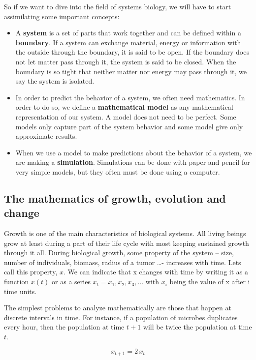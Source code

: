 \documentclass[12pt]{article}
\begin{document}
So if we want to dive into the field of systems biology, we will have to start assimilating some important concepts: 
\begin{itemize}
	\item A \textbf{system} is a set of parts that work together and can be defined within a \textbf{boundary}. If a system can exchange material, energy or information with the outside through the boundary, it is said to be open. If the boundary does not let matter pass through it, the system is said to be closed. When the boundary is so tight that neither matter nor energy may pass through it, we say the system is isolated.
	\item In order to predict the behavior of a system, we often need mathematics. In order to do so, we define a \textbf{mathematical model} as any mathematical representation of our system. A model does not need to be perfect. Some models only capture part of the system behavior and some model give only  approximate results.
	\item When we use a model to make predictions about the behavior of a system, we are making a \textbf{simulation}. Simulations can be done with paper and pencil for very simple models, but they often must be done using a computer.
\end{itemize}

\subsection{The mathematics of growth, evolution and change}
Growth is one of the main characteristics of biological systems. All living beings grow at least during a part of their life cycle with most keeping sustained growth through it all. During biological growth, some property of the system -- size, number of individuals, biomass, radius of a tumor \dots - increases with time. Lets call this property, $x$. We can indicate that x changes with time by writing it as a function $x(t)$ or as a series $x_t = x_1, x_2, x_3,\dots$ with $x_i$ being the value of x after i time units.

The simplest problems to analyze mathematically are those that happen at discrete intervals in time. For instance, if a population of microbes duplicates every hour, then the population at time $t+1$ will be twice the population at time $t$.

\begin{equation}
	\label{geomgrowth_example}
	x_{t+1} = 2 \, x_t
\end{equation}
\end{document}
